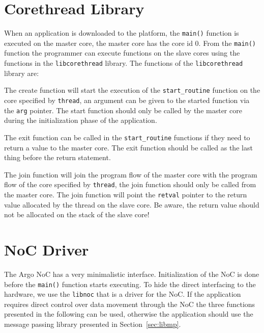 \documentclass[a4paper,fontsize=10pt,twoside,DIV15,BCOR12mm,headinclude=true,footinclude=false,pagesize,bibtotoc]{scrbook}
\newcommand{\code}[1]{{\texttt{#1}}}
\renewenvironment{description}%
{
\begin{basedescript}{
\desclabelstyle{\nextlinelabel}
\renewcommand{\makelabel}[1]{%
\parbox[b]{\textwidth}{\bfseries##1}%
}%
\desclabelwidth{2em}}}
{
\end{basedescript}
}
\begin{document}
\section{Corethread Library}
\label{sec:cthread}
When an application is downloaded to the platform, the \code{main()} function is executed on the master core, the master core has the core id 0.
From the \code{main()} function the programmer can execute functions on the slave cores using the functions in the \code{libcorethread} library.
The functions of the \code{libcorethread} library are:
\begin{description}
\item[\code{int corethread\_create( corethread\_t *thread, void(*start\_routine)(void *), void *arg ) )}]

The create function will start the execution of the \code{start\_routine} function on the core specified by \code{thread}, an argument can be given to the started function via the \code{arg} pointer. The start function should only be called by the master core during the initialization phase of the application.

\item[\code{void corethread\_exit( void * retval )}]

The exit function can be called in the \code{start\_routine} functions if they need to return a value to the master core.
The exit function should be called as the last thing before the return statement.

\item[\code{int corethread\_join( corethread\_t thread, void ** retval )}]

The join function will join the program flow of the master core with the program flow of the core specified by \code{thread}, the join function should only be called from the master core. The join function will point the \code{retval} pointer to the return value allocated by the thread on the slave core. Be aware, the return value should not be allocated on the stack of the slave core!

\end{description}


\section{NoC Driver}
The Argo NoC has a very minimalistic interface.
Initialization of the NoC is done before the \code{main()} function starts executing.
To hide the direct interfacing to the hardware, we use the \code{libnoc} that is a driver for the NoC.
If the application requires direct control over data movement through the NoC the three functions presented in the following can be used, otherwise the application should use the message passing library presented in Section~\ref{sec:libmp}.
\end{document}
